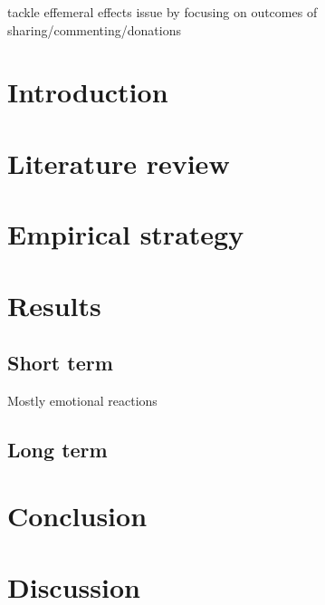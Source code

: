 \documentclass[12pt]{article}
\begin{document}
tackle effemeral effects issue by focusing on outcomes of sharing/commenting/donations

\section{Introduction}



\section{Literature review}


\section{Empirical strategy}


\section{Results}




\subsection{Short term} 
Mostly emotional reactions 


\subsection{Long term}



\section{Conclusion}


\section{Discussion}



\end{document}
